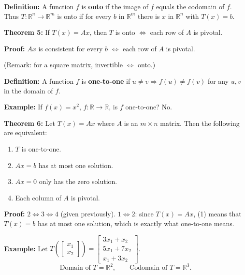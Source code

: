 \documentclass{article}
\begin{document}
\newpage

\textbf{Definition:} A function $f$ is \textbf{onto} if the image of $f$ equals the codomain of $f$. Thus $T: \mathbb{R}^n \to \mathbb{R}^m$ is onto if for every $b$ in $\mathbb{R}^m$ there is $x$ in $\mathbb{R}^n$ with $T(x) = b$.

\bigskip

\textbf{Theorem 5:} If $T(x) = Ax$, then $T$ is onto $\iff$ each row of $A$ is pivotal.

\medskip

\textbf{Proof:} $Ax$ is consistent for every $b$ $\iff$ each row of $A$ is pivotal.

\medskip

(Remark: for a square matrix, invertible $\iff$ onto.)

\bigskip

\textbf{Definition:} A function $f$ is \textbf{one-to-one} if $u \neq v \Rightarrow f(u) \neq f(v)$ for any $u, v$ in the domain of $f$.

\medskip

\textbf{Example:} If $f(x) = x^2$, $f: \mathbb{R} \to \mathbb{R}$, is $f$ one-to-one? No.

\newpage

\textbf{Theorem 6:} Let $T(x) = Ax$ where $A$ is an $m \times n$ matrix. Then the following are equivalent:
\begin{enumerate}
\item $T$ is one-to-one.
\item $Ax = b$ has at most one solution.
\item $Ax = 0$ only has the zero solution.
\item Each column of $A$ is pivotal.
\end{enumerate}

\medskip

\textbf{Proof:} $2 \iff 3 \iff 4$ (given previously). $1 \iff 2$: since $T(x) = Ax$, (1) means that $T(x) = b$ has at most one solution, which is exactly what one-to-one means.

\bigskip

\textbf{Example:} Let $T\left( \begin{bmatrix} x_1 \\ x_2 \end{bmatrix} \right) = \begin{bmatrix} 3x_1 + x_2 \\ 5x_1 + 7x_2 \\ x_1 + 3x_2 \end{bmatrix}$.
\[
\text{Domain of } T = \mathbb{R}^2, \qquad \text{Codomain of } T = \mathbb{R}^3.
\]
\end{document}
